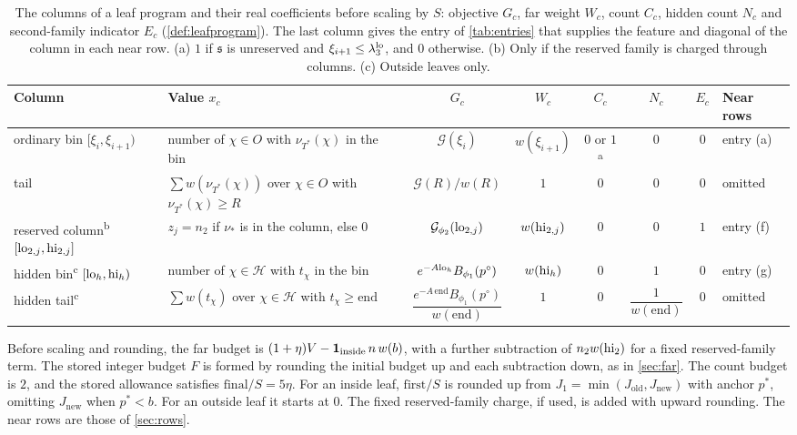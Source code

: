 \begin{table}[ht]
\centering
\footnotesize
\setlength{\tabcolsep}{3.5pt}
\renewcommand{\arraystretch}{1.35}
\begin{tabular}{@{}>{\raggedright\arraybackslash}p{2.25cm}>{\raggedright\arraybackslash}p{3.3cm}cccccl@{}}
\toprule
Column & Value $x_c$ & $G_c$ & $W_c$ & $C_c$ & $N_c$ & $E_c$ & Near rows\\
\midrule
ordinary bin $[\xi_i,\xi_{i+1})$ & number of $\chi\in O$ with $\nu_{T^*}(\chi)$ in the bin & $\mathcal G(\xi_i)$ &
  $w(\xi_{i+1})$ & $0$ or $1$\textsuperscript{a} & $0$ & $0$ & entry (a)\\
tail & $\sum w(\nu_{T^*}(\chi))$ over $\chi\in O$ with $\nu_{T^*}(\chi)\ge R$ & $\mathcal G(R)/w(R)$ & $1$ & $0$ &
  $0$ & $0$ & omitted\\
reserved column\textsuperscript{b} $[\mathrm{lo}_{2,j},\mathrm{hi}_{2,j}]$ & $z_j=n_2$ if $\nu_*$ is in the column, else $0$ &
  $\mathcal G_{\phi_2}(\mathrm{lo}_{2,j})$ & $w(\mathrm{hi}_{2,j})$ & $0$ & $0$ & $1$ & entry (f)\\
hidden bin\textsuperscript{c} $[\mathrm{lo}_h,\mathrm{hi}_h)$ & number of $\chi\in\mathcal H$ with $t_\chi$ in the bin &
  $e^{-A\mathrm{lo}_h}B_{\phi_1}(p^\circ)$ & $w(\mathrm{hi}_h)$ & $0$ & $1$ & $0$ & entry (g)\\
hidden tail\textsuperscript{c} & $\sum w(t_\chi)$ over $\chi\in\mathcal H$ with $t_\chi\ge\mathrm{end}$ &
  $\dfrac{e^{-A\,\mathrm{end}}B_{\phi_1}(p^\circ)}{w(\mathrm{end})}$ & $1$ & $0$ & $\dfrac1{w(\mathrm{end})}$ & $0$ &
  omitted\\
\bottomrule
\end{tabular}
\caption{The columns of a leaf program and their real coefficients before scaling by $S$:
objective $G_c$, far weight $W_c$, count $C_c$, hidden count $N_c$ and second-family indicator
$E_c$ (\cref{def:leafprogram}). The last column gives the entry of \cref{tab:entries} that supplies
the feature and diagonal of the column in each near row. (a) $1$ if $\mathfrak s$ is unreserved
and $\xi_{i+1}\le\lambda_3^{\mathrm{lo}}$, and $0$ otherwise. (b) Only if the reserved family is charged
through columns. (c) Outside leaves only.}
\label{tab:leafmodel}
\end{table}
Before scaling and rounding, the far budget is $(1+\eta)V-\mathbf{1}_{\mathrm{inside}}\,n\,w(b)$,
with a further subtraction of $n_2w(\mathrm{hi}_2)$ for a fixed reserved-family term.
The stored integer budget $F$ is formed by rounding the initial budget up and each
subtraction down, as in \cref{sec:far}. The count budget is $2$, and the stored
allowance satisfies $\mathrm{final}/S=5\eta$.
For an inside leaf, $\mathrm{first}/S$ is rounded up from
$J_1=\min(J_{\mathrm{old}},J_{\mathrm{new}})$ with anchor $p^*$, omitting
$J_{\mathrm{new}}$ when $p^*<b$. For an outside leaf it starts at $0$.
The fixed reserved-family charge, if used, is added with upward rounding.
The near rows are those of \cref{sec:rows}.


